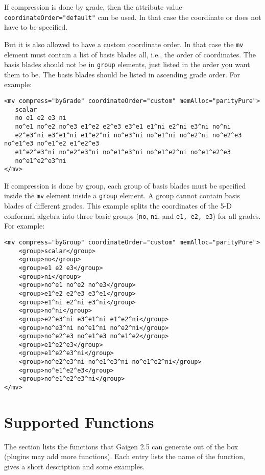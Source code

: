 \documentclass[10pt, a4paper]{article}
\begin{document}
If compression is done by grade, then the attribute value {\tt coordinateOrder="default"} can be used. In that case
the coordinate or does not have to be specified. 

But it is also allowed to have a custom coordinate order. 
In that case the {\tt mv} element must contain a list of basis blades all, i.e., the order of coordinates.
The basis blades should not be in {\tt group} elements, just listed in the order you want them to be. The basis blades
should be listed in ascending grade order. For example:
\begin{verbatim}
<mv compress="byGrade" coordinateOrder="custom" memAlloc="parityPure">
   scalar
   no e1 e2 e3 ni
   no^e1 no^e2 no^e3 e1^e2 e2^e3 e3^e1 e1^ni e2^ni e3^ni no^ni
   e2^e3^ni e3^e1^ni e1^e2^ni no^e3^ni no^e1^ni no^e2^ni no^e2^e3 no^e1^e3 no^e1^e2 e1^e2^e3
   e1^e2^e3^ni no^e2^e3^ni no^e1^e3^ni no^e1^e2^ni no^e1^e2^e3
   no^e1^e2^e3^ni
</mv>
\end{verbatim}
  
If compression is done by group, each group of basis blades must be specified inside the {\tt mv} element inside a {\tt group} element. 
A group cannot contain basis blades of different grades. This example splits the coordinates of the 5-D conformal algebra into
three basic groups ({\tt no}, {\tt ni}, and {\tt e1, e2, e3}) for all grades. For example:
\begin{verbatim}
<mv compress="byGroup" coordinateOrder="custom" memAlloc="parityPure">
    <group>scalar</group>
    <group>no</group>
    <group>e1 e2 e3</group>
    <group>ni</group>
    <group>no^e1 no^e2 no^e3</group>
    <group>e1^e2 e2^e3 e3^e1</group> 
    <group>e1^ni e2^ni e3^ni</group>
    <group>no^ni</group>
    <group>e2^e3^ni e3^e1^ni e1^e2^ni</group>
    <group>no^e3^ni no^e1^ni no^e2^ni</group>
    <group>no^e2^e3 no^e1^e3 no^e1^e2</group>
    <group>e1^e2^e3</group>
    <group>e1^e2^e3^ni</group>
    <group>no^e2^e3^ni no^e1^e3^ni no^e1^e2^ni</group>
    <group>no^e1^e2^e3</group>
    <group>no^e1^e2^e3^ni</group>
</mv>
\end{verbatim}
 
 
\section{Supported Functions}
\label{s:functions}

The section lists the functions that Gaigen 2.5 can generate out of the box
(plugins may add more functions). Each entry lists the name of the function,
gives a short description and some examples.
\end{document}
